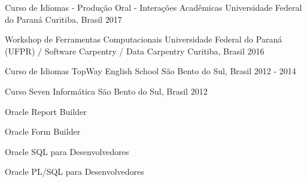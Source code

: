 

\begin{cventries}

 \cventry
    {Curso de Idiomas - Produção Oral - Interações Acadêmicas} %
    {Universidade Federal do Paraná} %
    {Curitiba, Brasil} %
    {2017} %
    {
    }

  \cventry
	{Workshop de Ferramentas Computacionais} %
	{Universidade Federal do Paraná (UFPR) / Software Carpentry / Data Carpentry} %
	{Curitiba, Brasil} %
	{2016} %
	{
	}

  \cventry
    {Curso de Idiomas} %
    {TopWay English School} %
    {São Bento do Sul, Brasil} %
    {2012 - 2014} %
    {
    }

  \cventry
    {Curso} %
    {Seven Informática} %
    {São Bento do Sul, Brasil} %
    {2012} %
    {
      \begin{cvitems} %
        \item {Oracle Report Builder}
        \item {Oracle Form Builder}
        \item {Oracle SQL para Desenvolvedores}
        \item {Oracle PL/SQL para Desenvolvedores}
      \end{cvitems}
    }


\end{cventries}
